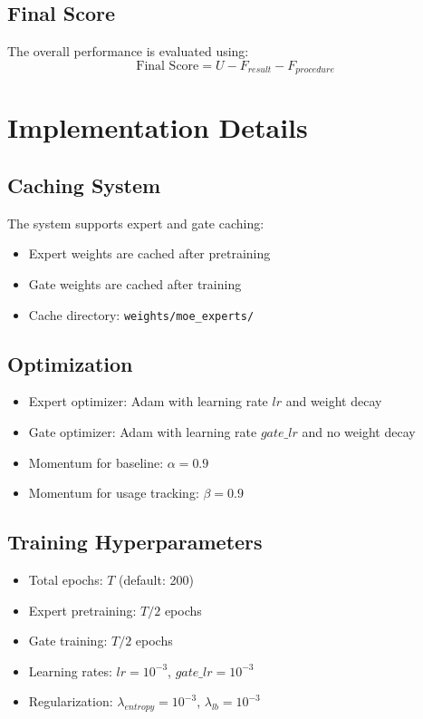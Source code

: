 \documentclass[11pt]{article}
\begin{document}
\subsection{Final Score}
The overall performance is evaluated using:
\begin{equation}
    \text{Final Score} = U - F_{result} - F_{procedure}
\end{equation}

\section{Implementation Details}

\subsection{Caching System}
The system supports expert and gate caching:
\begin{itemize}
    \item Expert weights are cached after pretraining
    \item Gate weights are cached after training
    \item Cache directory: \texttt{weights/moe\_experts/}
\end{itemize}

\subsection{Optimization}
\begin{itemize}
    \item Expert optimizer: Adam with learning rate $lr$ and weight decay
    \item Gate optimizer: Adam with learning rate $gate\_lr$ and no weight decay
    \item Momentum for baseline: $\alpha = 0.9$
    \item Momentum for usage tracking: $\beta = 0.9$
\end{itemize}

\subsection{Training Hyperparameters}
\begin{itemize}
    \item Total epochs: $T$ (default: 200)
    \item Expert pretraining: $T/2$ epochs
    \item Gate training: $T/2$ epochs
    \item Learning rates: $lr = 10^{-3}$, $gate\_lr = 10^{-3}$
    \item Regularization: $\lambda_{entropy} = 10^{-3}$, $\lambda_{lb} = 10^{-3}$
\end{itemize}
\end{document}
